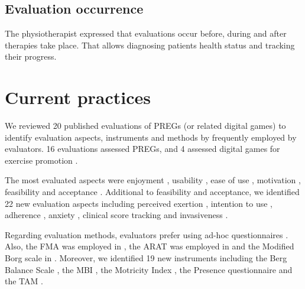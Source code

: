 \subsection{Evaluation occurrence}
The physiotherapist expressed that evaluations occur before, during and after therapies take place. That allows diagnosing patients health status and tracking their progress. 

\section{Current practices}\label{sec:current_aspects}

We reviewed 20 published evaluations of \acp{PREG} (or related digital games) to identify evaluation aspects, instruments and methods by frequently employed by evaluators. 16 evaluations assessed \acp{PREG}, \autocite{Celinder2012,Deutsch2011,Rand2008,Brokaw2015,Burke2009,Chang2011,Fitzgerald2008,Hernandez2013,McNeill2012,Ni2014,PirovanoAdvisor2012,Saposnik2010,Seo2016,Shin2014,Sugarman2009,Wuest2014} and 4 assessed digital games for exercise promotion \autocite{Berkovsky2010,Sinclair2010,Zhang2011,Moran2015}.

The most evaluated aspects were enjoyment \autocite{Sinclair2007,Ni2014,Hernandez2013,Berkovsky2010,Shin2014,Moran2015,Chang2011,Rand2008,McNeill2012}, usability \autocite{PirovanoAdvisor2012,Ni2014,Brokaw2015,Rand2008,Fitzgerald2008,McNeill2012}, ease of use \autocite{Wuest2014,PirovanoAdvisor2012,Hernandez2013,Moran2015,Burke2009,Seo2016}, motivation \autocite{Ni2014,Brokaw2015,Shin2014,Chang2011,Seo2016,McNeill2012}, feasibility \autocite{PirovanoAdvisor2012,Sugarman2009,Shin2014,Rand2008,Saposnik2010} and acceptance \autocite{Wuest2014,PirovanoAdvisor2012}. Additional to feasibility and acceptance, we identified 22 new evaluation aspects including perceived exertion \autocite{Berkovsky2010,Chang2011,Rand2008,McNeill2012}, intention to use \autocite{Wuest2014,Moran2015}, adherence \autocite{Wuest2014,PirovanoAdvisor2012}, anxiety \autocite{Moran2015}, clinical score tracking \autocite{Seo2016} and invasiveness \autocite{McNeill2012}.

Regarding evaluation methods, evaluators prefer using ad-hoc questionnaires \autocite{Sinclair2007,Zhang2011,Wuest2014,PirovanoAdvisor2012,Ni2014,Brokaw2015,Hernandez2013,Berkovsky2010,Shin2014,Rand2008,Burke2009,Seo2016}. Also, the \ac{FMA} \autocite{FMAscale} was employed in \autocite{Brokaw2015,Shin2014,Seo2016}, the \ac{ARAT} was employed in \autocite{Shin2014,McNeill2012} and the Modified Borg scale in \autocite{Rand2008,McNeill2012}. Moreover, we identified 19 new instruments including the Berg Balance Scale \autocite{bergScale}, the \ac{MBI} \autocite{mbiScale}, the Motricity Index \autocite{motricityIndex}, the Presence questionnaire \autocite{Witmer2005} and the \ac{TAM} \autocite{Davis1989}.

